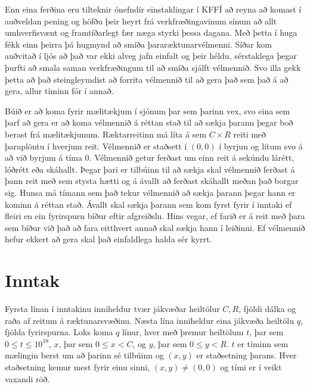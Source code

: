 
Enn eina ferðina eru tilteknir ónefndir einstaklingar í KFFÍ að reyna að komast
í auðveldan pening og höfðu þeir heyrt frá verkfræðingavinum sínum að allt
umhverfisvænt og framtíðarlegt fær næga styrki þessa dagana. Með þetta í
huga fékk einn þeirra þá hugmynd að smíða þararæktunarvélmenni. Síðar kom
auðvitað í ljós að það var ekki alveg jafn einfalt og þeir héldu, sérstaklega
þegar þurfti að smala saman verkfræðingum til að smíða sjálft vélmennið. Svo
illa gekk þetta að það steingleymdist að forrita vélmennið til að gera það
sem það á að gera, allur tíminn fór í annað. 

Búið er að koma fyrir mælitækjum í sjónum þar sem þarinn vex, svo eina sem
þarf að gera er að koma vélmennið á réttan stað til að sækja þarann þegar
boð berast frá mælitækjunum. Ræktarreitinn má líta á sem $C \times R$ reiti
með þaraplöntu í hverjum reit. Vélmennið er staðsett í $(0, 0)$ í byrjun og
lítum svo á að við byrjum á tíma $0$. Vélmennið getur ferðast um einn reit á 
sekúndu lárétt, lóðrétt eða skáhallt. Þegar þari er tilbúinn til að sækja skal 
vélmennið ferðast á þann reit með sem stysta hætti og á ávallt að ferðast 
skáhallt meðan það borgar sig. Hunsa má tímann sem það tekur vélmennið að 
sækja þarann þegar hann er kominn á réttan stað. Ávallt skal sækja þarann 
sem kom fyrst fyrir í inntaki ef fleiri en ein fyrirspurn bíður eftir afgreiðslu. 
Hins vegar, ef farið er á reit með þara sem bíður við það að fara eitthvert 
annað skal sækja hann í leiðinni. Ef vélmennið hefur ekkert að gera skal það
einfaldlega halda sér kyrrt.

\section*{Inntak}
Fyrsta línan í inntakinu inniheldur tvær jákvæðar heiltölur $C, R$,
fjöldi dálka og raða af reitum á ræktunarsvæðinu. Næsta lína inniheldur eina
jákvæða heiltölu $q$, fjölda fyrirspurna. Loks koma $q$ línur, hver með
þremur heiltölum $t$, þar sem $0 \leq t \leq 10^{18}$, $x$, þar sem $0 \leq x < C$,
 og $y$, þar sem $0 \leq y < R$.
$t$ er tíminn sem mælingin berst um að þarinn sé tilbúinn og $(x, y)$ er staðsetning
þarans. Hver staðsetning kemur mest fyrir einu sinni, $(x, y) \neq (0, 0)$ og 
tími er í veikt vaxandi röð.

